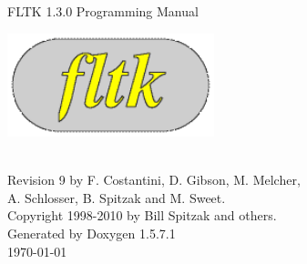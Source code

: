 \documentclass[a4paper]{book}
\begin{document}
\begin{titlepage}
\vspace*{4.5cm}
\begin{center}
{\Huge FLTK 1.3.0 Programming Manual}\\
\vspace*{2cm}
\begin{ImageNoCaption}
 \mbox{\includegraphics[width=6cm]{FL200}}
\end{ImageNoCaption}\\
\vspace*{2cm}
{\Large
Revision 9 by F. Costantini, D. Gibson, M. Melcher, \\
A. Schlosser, B. Spitzak and M. Sweet.}\\
\vspace*{1.5cm}
{\large Copyright 1998-2010 by Bill Spitzak and others.}\\
\vspace*{3.5cm}
{\large Generated by Doxygen 1.5.7.1}\\
\vspace*{0.5cm}
\today{}\\
\end{center}
\end{titlepage}
\clearemptydoublepage
{}
\tableofcontents
\clearemptydoublepage
{}
\end{document}
